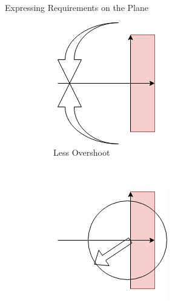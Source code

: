 \documentclass{../templates/topic}
\begin{document}
\begin{section}{Expressing Requirements on the Plane}
\begin{figure}
\begin{subfigure}[b]{0.4\textwidth}
		\includegraphics[width=\textwidth]{complex_plane_overshoot.png}
		\caption{Less Overshoot}
		\end{subfigure}
		\\
		\begin{subfigure}[b]{0.4\textwidth}
		\includegraphics[width=\textwidth]{complex_plane_rise.png}

\end{subfigure}
\end{figure}
\end{section}
\end{document}
